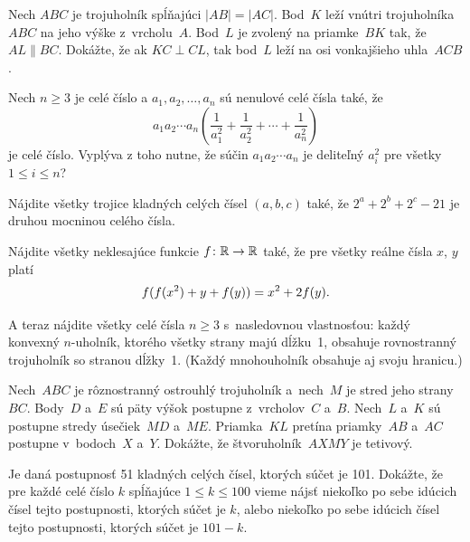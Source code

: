 {%

Nech $ABC$ je trojuholník spĺňajúci $|AB|=|AC|$. Bod~$K$ leží vnútri trojuholníka~$ABC$ na jeho výške z~vrcholu~$A$. Bod~$L$ je zvolený na priamke~$BK$ tak, že $AL \parallel BC$. Dokážte, že ak $KC \perp CL$, tak bod~$L$ leží na osi vonkajšieho uhla~$ACB$.}

{%

Nech $n\ge 3$ je celé číslo a $a_1,a_2,\dots,a_n$ sú nenulové celé čísla také, že
$$
a_1a_2\cdots a_n \left( \frac{1}{a_1^2}+\frac{1}{a_2^2}+\cdots+ \frac{1}{a_n^2}\right)
$$
je celé číslo. Vyplýva z toho nutne, že súčin $a_1a_2\cdots a_n$ je deliteľný $a_i^2$ pre všetky $1\le i\le n$?}

{%

Nájdite všetky trojice kladných celých čísel $(a,b,c)$ také, že $2^a+2^b+2^c-21$ je druhou mocninou celého čísla.}

{%

Nájdite všetky neklesajúce funkcie $f\colon\Bbb R\rightarrow\Bbb R$ také, že pre všetky reálne čísla $x$, $y$ platí
$$
f(f(x^2)+y+f(y))=x^2+2f(y).
\belowdisplayskip0pt
$$}

{%

A teraz nájdite všetky celé čísla $n \ge 3$ s~nasledovnou vlastnosťou: každý konvexný $n$-uholník, ktorého všetky strany majú dĺžku~1, obsahuje rovnostranný trojuholník so stranou dĺžky~1. (Každý mnohouholník obsahuje aj svoju hranicu.)}

{%

Nech~$ABC$ je rôznostranný ostrouhlý trojuholník a~nech~$M$ je stred jeho strany~$BC$. Body~$D$ a~$E$ sú päty výšok postupne z~vrcholov~$C$ a~$B$. Nech~$L$ a~$K$ sú postupne stredy úsečiek~$MD$ a~$ME$. Priamka~$KL$ pretína priamky~$AB$ a~$AC$ postupne v~bodoch~$X$ a~$Y$. Dokážte, že štvoruholník~$AXMY$ je tetivový.}

{%

Je daná postupnosť 51 kladných celých čísel, ktorých súčet je 101. Dokážte, že pre každé celé číslo $k$ spĺňajúce $1\le k\le 100$ vieme nájsť niekoľko po sebe idúcich čísel tejto postupnosti, ktorých súčet je $k$, alebo niekoľko po sebe idúcich čísel tejto postupnosti, ktorých súčet je $101-k$.}

